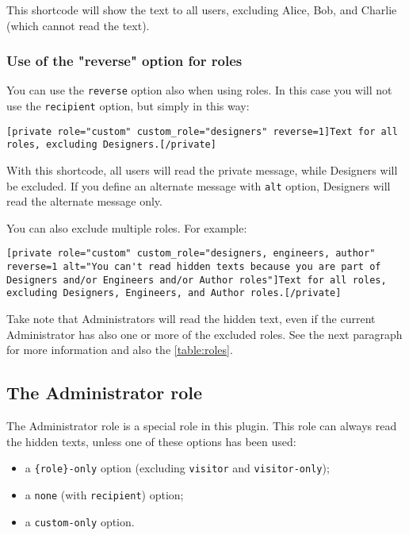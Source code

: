 \documentclass[a4paper,11pt]{article}
\begin{document}
This shortcode will show the text to all users, excluding Alice, Bob, and Charlie (which cannot read the text).

\subsubsection{Use of the "reverse" option for roles}

You can use the \verb+reverse+ option also when using roles. In this case you will not use the \verb+recipient+ option, but simply in this way:

\begin{lstlisting}
[private role="custom" custom_role="designers" reverse=1]Text for all roles, excluding Designers.[/private]
\end{lstlisting}

With this shortcode, all users will read the private message, while Designers will be excluded. If you define an alternate message with \verb+alt+ option, Designers will read the alternate message only.

You can also exclude multiple roles. For example:

\begin{lstlisting}
[private role="custom" custom_role="designers, engineers, author" reverse=1 alt="You can't read hidden texts because you are part of Designers and/or Engineers and/or Author roles"]Text for all roles, excluding Designers, Engineers, and Author roles.[/private]
\end{lstlisting}

Take note that Administrators will read the hidden text, even if the current Administrator has also one or more of the excluded roles. See the next paragraph for more information and also the \ref{table:roles}.

\subsection{The Administrator role}

The Administrator role is a special role in this plugin. This role can always read the hidden texts, unless one of these options has been used:

\begin{itemize}
 \item a \verb+{role}-only+ option (excluding \verb+visitor+ and \verb+visitor-only+);
 \item a \verb+none+ (with \verb+recipient+) option;
 \item a \verb+custom-only+ option.
\end{itemize}
\end{document}
